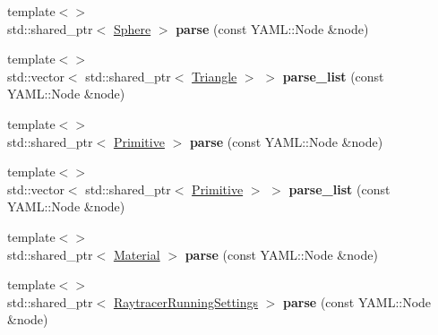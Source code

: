 \begin{DoxyCompactItemize}
\item 
\mbox{\label{classomg_1_1_y_a_m_l_parser_a50793579e616dc6ec88a617d74080786}} 
{\footnotesize template$<$$>$ }\\std\+::shared\+\_\+ptr$<$ \mbox{\hyperlink{classomg_1_1_sphere}{Sphere}} $>$ {\bfseries parse} (const Y\+A\+M\+L\+::\+Node \&node)
\item 
\mbox{\label{classomg_1_1_y_a_m_l_parser_ab6a6ffe5e8dd000873db4f9814274c80}} 
{\footnotesize template$<$$>$ }\\std\+::vector$<$ std\+::shared\+\_\+ptr$<$ \mbox{\hyperlink{classomg_1_1_triangle}{Triangle}} $>$ $>$ {\bfseries parse\+\_\+list} (const Y\+A\+M\+L\+::\+Node \&node)
\item 
\mbox{\label{classomg_1_1_y_a_m_l_parser_afe751a9745d6d98f08e0cec42abf98c1}} 
{\footnotesize template$<$$>$ }\\std\+::shared\+\_\+ptr$<$ \mbox{\hyperlink{classomg_1_1_primitive}{Primitive}} $>$ {\bfseries parse} (const Y\+A\+M\+L\+::\+Node \&node)
\item 
\mbox{\label{classomg_1_1_y_a_m_l_parser_ab0baf9cfe2c38f4f347458ecb4d4939c}} 
{\footnotesize template$<$$>$ }\\std\+::vector$<$ std\+::shared\+\_\+ptr$<$ \mbox{\hyperlink{classomg_1_1_primitive}{Primitive}} $>$ $>$ {\bfseries parse\+\_\+list} (const Y\+A\+M\+L\+::\+Node \&node)
\item 
\mbox{\label{classomg_1_1_y_a_m_l_parser_a2c72beefd1858a812f5cec59c8536d0f}} 
{\footnotesize template$<$$>$ }\\std\+::shared\+\_\+ptr$<$ \mbox{\hyperlink{classomg_1_1_material}{Material}} $>$ {\bfseries parse} (const Y\+A\+M\+L\+::\+Node \&node)
\item 
\mbox{\label{classomg_1_1_y_a_m_l_parser_a0d8c854b90d0f732896e189f97891ed4}} 
{\footnotesize template$<$$>$ }\\std\+::shared\+\_\+ptr$<$ \mbox{\hyperlink{structomg_1_1_raytracer_running_settings}{Raytracer\+Running\+Settings}} $>$ {\bfseries parse} (const Y\+A\+M\+L\+::\+Node \&node)
\item 
\mbox{\label{classomg_1_1_y_a_m_l_parser_ad0148bff25d36e0f0a46ab52647e5ef7}} 

\end{DoxyCompactItemize}
